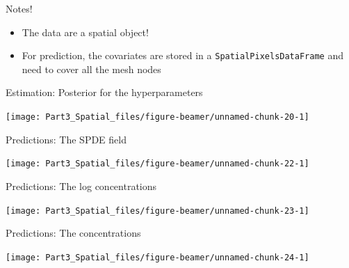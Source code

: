 \documentclass[
  ignorenonframetext,
]{beamer}
\begin{document}
\begin{frame}[fragile]{Notes!}
\protect\hypertarget{notes}{}
\begin{itemize}
\item
  The data are a spatial object!
\item
  For prediction, the covariates are stored in a
  \texttt{SpatialPixelsDataFrame} and need to cover all the mesh nodes
\end{itemize}
\end{frame}

\begin{frame}{Estimation: Posterior for the hyperparameters}
\protect\hypertarget{estimation-posterior-for-the-hyperparameters}{}
\begin{center}\texttt{[image: Part3\_Spatial\_files/figure-beamer/unnamed-chunk-20-1]} \end{center}
\end{frame}

\begin{frame}{Predictions: The SPDE field}
\protect\hypertarget{predictions-the-spde-field}{}
\begin{center}\texttt{[image: Part3\_Spatial\_files/figure-beamer/unnamed-chunk-22-1]} \end{center}
\end{frame}

\begin{frame}{Predictions: The log concentrations}
\protect\hypertarget{predictions-the-log-concentrations}{}
\begin{center}\texttt{[image: Part3\_Spatial\_files/figure-beamer/unnamed-chunk-23-1]} \end{center}
\end{frame}

\begin{frame}{Predictions: The concentrations}
\protect\hypertarget{predictions-the-concentrations}{}
\begin{center}\texttt{[image: Part3\_Spatial\_files/figure-beamer/unnamed-chunk-24-1]} \end{center}
\end{frame}
\end{document}
